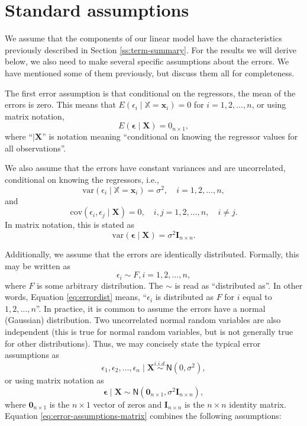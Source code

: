 \documentclass[
]{book}
\theoremstyle{definition}
\theoremstyle{definition}
\theoremstyle{definition}
\theoremstyle{definition}
\theoremstyle{remark}
\begin{document}
\hypertarget{standard-assumptions}{%
\section{Standard assumptions}\label{standard-assumptions}}

We assume that the components of our linear model have the characteristics previously described in Section \ref{ss:term-summary}. For the results we will derive below, we also need to make several specific assumptions about the errors. We have mentioned some of them previously, but discuss them all for completeness.

The first error assumption is that conditional on the regressors, the mean of the errors is zero. This means that \(E(\epsilon_i \mid \mathbb{X} = \mathbf{x}_i)=0\) for \(i=1,2,\ldots,n\), or using matrix notation,
\[
E(\boldsymbol{\epsilon}\mid \mathbf{X}) = 0_{n\times 1},
\]
where ``\(\mid \mathbf{X}\)'' is notation meaning ``conditional on knowing the regressor values for all observations''.

We also assume that the errors have constant variances and are uncorrelated, conditional on knowing the regressors, i.e.,
\[\mathrm{var}(\epsilon_i\mid \mathbb{X}=\mathbf{x}_i) = \sigma^2, \quad i=1,2,\ldots,n,\]
and
\[
\mathrm{cov}(\epsilon_i, \epsilon_j\mid \mathbf{X}) = 0, \quad i,j=1,2,\ldots,n,\quad i\neq j.
\]
In matrix notation, this is stated as
\[
\mathrm{var}(\boldsymbol{\epsilon} \mid {\mathbf{X}})=\sigma^2\mathbf{I}_{n\times n}.
\]

Additionally, we assume that the errors are identically distributed. Formally, this may be written as
\[
\epsilon_i \sim F, i=1,2,\ldots,n,
\label{eq:errordist}
\]
where \(F\) is some arbitrary distribution. The \(\sim\) is read as ``distributed as''. In other words, Equation \eqref{eq:errordist} means, ``\(\epsilon_i\) is distributed as \(F\) for \(i\) equal to \(1,2,\ldots,n\)''. In practice, it is common to assume the errors have a normal (Gaussian) distribution. Two uncorrelated normal random variables are also independent (this is true for normal random variables, but is not generally true for other distributions). Thus, we may concisely state the typical error assumptions as
\[
\epsilon_1,\epsilon_2,\ldots,\epsilon_n \mid \mathbf{X}\stackrel{i.i.d.}{\sim} \mathsf{N}(0, \sigma^2),
\]
or using matrix notation as
\[
\boldsymbol{\epsilon}\mid \mathbf{X}\sim \mathsf{N}(\mathbf{0}_{n\times 1},\sigma^2 \mathbf{I}_{n\times n}), \label{eq:error-assumptions-matrix}
\]
where \(\mathbf{0}_{n\times 1}\) is the \(n \times 1\) vector of zeros and \(\mathbf{I}_{n\times n}\) is the \(n\times n\) identity matrix. Equation \eqref{eq:error-assumptions-matrix}
combines the following assumptions:
\end{document}
